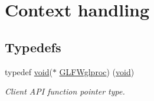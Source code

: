 \hypertarget{group__context}{}\section{Context handling}
\label{group__context}
\subsection*{Typedefs}
\begin{DoxyCompactItemize}
\item 
typedef \hyperlink{wglew_8h_aeea6e3dfae3acf232096f57d2d57f084}{void}($\ast$ \hyperlink{group__context_ga3d47c2d2fbe0be9c505d0e04e91a133c}{G\+L\+F\+Wglproc}) (\hyperlink{wglew_8h_aeea6e3dfae3acf232096f57d2d57f084}{void})
\begin{DoxyCompactList}\small\item\em Client A\+P\+I function pointer type. \end{DoxyCompactList}\end{DoxyCompactItemize}
